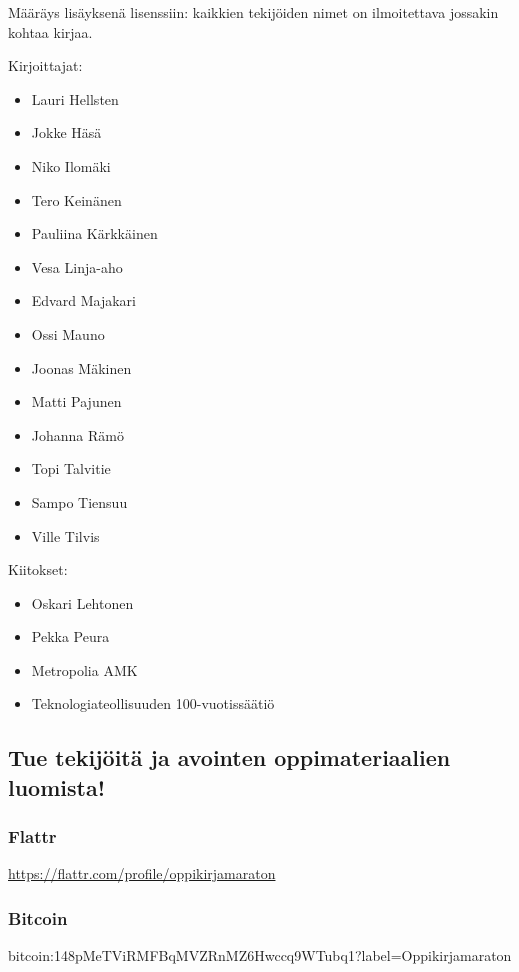 Määräys lisäyksenä lisenssiin: kaikkien tekijöiden nimet on ilmoitettava jossakin kohtaa kirjaa.

\begin{minipage}[t]{0.4\textwidth}
Kirjoittajat:
\begin{itemize}
\item Lauri Hellsten
\item Jokke Häsä
\item Niko Ilomäki
\item Tero Keinänen
\item Pauliina Kärkkäinen
\item Vesa Linja-aho
\item Edvard Majakari
\item Ossi Mauno
\item Joonas Mäkinen
\item Matti Pajunen
\item Johanna Rämö
\item Topi Talvitie
\item Sampo Tiensuu
\item Ville Tilvis
\end{itemize}
\end{minipage}
\begin{minipage}[t]{0.8\textwidth}
Kiitokset:
\begin{itemize}
\item Oskari Lehtonen %
\item Pekka Peura %
\item Metropolia AMK %
\item Teknologiateollisuuden 100-vuotissäätiö %
\end{itemize}
\end{minipage}






\subsection*{Tue tekijöitä ja avointen oppimateriaalien luomista!}

\subsubsection*{Flattr}
\url{https://flattr.com/profile/oppikirjamaraton}



\subsubsection*{Bitcoin}

bitcoin:148pMeTViRMFBqMVZRnMZ6Hwccq9WTubq1?label=Oppikirjamaraton
